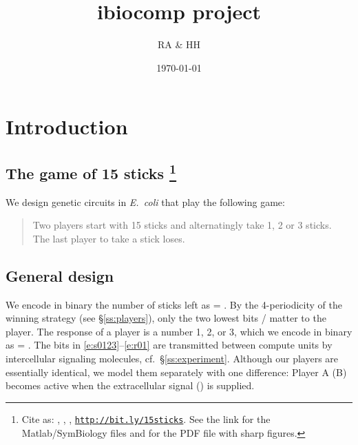 \documentclass[12pt,notitlepage]{article}
\title{ibiocomp project}
\author{RA \& HH}
\date{\today}
\def\[#1\]{\begin{align}#1\end{align}}
\newcommand{\ra}[1]{{\color{Blue}#1}}
\newcommand{\linktodoc}{http://bit.ly/15sticks}
\begin{document}
\maketitle

\section{Introduction}

\subsection{The game of 15 sticks%
	\texorpdfstring{\footnote{%
		Cite as:
		\MyTitle, \MyAuthor, \MyDate,
		\href{\linktodoc}{{\texttt{\linktodoc}}}.
		See the link 
		for the Matlab/SymBiology files
		and 
		for the PDF file with sharp figures.%
	}}{}%
}


We design genetic circuits
\ra{in \emph{E.~coli}}
that play the following game:
%
\begin{quote}
	Two players start with 15 sticks
	and alternatingly 
	take 1, 2 or 3 sticks.
	\\
	The last player to take a stick loses.
\end{quote}



%



\subsection{General design} \label{s:general}

We encode in binary 
the number of sticks left as
\[
    \label{e:s0123}
     = 
    .
\]
%
%
By the 4-periodicity of the winning strategy
(see \S\ref{ss:players}),
only the two lowest bits /
matter to the player.
%
%
The response of a player is a number 1, 2, or 3,
which we encode in binary as
\[
    \label{e:r01}
     = 
    .
\]
%
The bits in \eqref{e:s0123}--\eqref{e:r01}
are transmitted 
between compute units
by 
intercellular signaling molecules,
cf.~\S\ref{ss:experiment}.
%
Although our players are essentially identical,
we model them separately with one difference:
Player A (B) becomes active when 
the extracellular signal  () is supplied.
\end{document}
